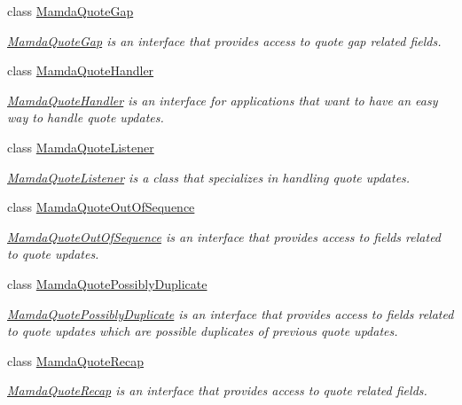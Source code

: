 \begin{CompactItemize}
class \hyperlink{classWombat_1_1MamdaQuoteGap}{Mamda\-Quote\-Gap}
\begin{CompactList}\small\item\em \hyperlink{classWombat_1_1MamdaQuoteGap}{Mamda\-Quote\-Gap} is an interface that provides access to quote gap related fields. \item\end{CompactList}\item 
class \hyperlink{classWombat_1_1MamdaQuoteHandler}{Mamda\-Quote\-Handler}
\begin{CompactList}\small\item\em \hyperlink{classWombat_1_1MamdaQuoteHandler}{Mamda\-Quote\-Handler} is an interface for applications that want to have an easy way to handle quote updates. \item\end{CompactList}\item 
class \hyperlink{classWombat_1_1MamdaQuoteListener}{Mamda\-Quote\-Listener}
\begin{CompactList}\small\item\em \hyperlink{classWombat_1_1MamdaQuoteListener}{Mamda\-Quote\-Listener} is a class that specializes in handling quote updates. \item\end{CompactList}\item 
class \hyperlink{classWombat_1_1MamdaQuoteOutOfSequence}{Mamda\-Quote\-Out\-Of\-Sequence}
\begin{CompactList}\small\item\em \hyperlink{classWombat_1_1MamdaQuoteOutOfSequence}{Mamda\-Quote\-Out\-Of\-Sequence} is an interface that provides access to fields related to quote updates. \item\end{CompactList}\item 
class \hyperlink{classWombat_1_1MamdaQuotePossiblyDuplicate}{Mamda\-Quote\-Possibly\-Duplicate}
\begin{CompactList}\small\item\em \hyperlink{classWombat_1_1MamdaQuotePossiblyDuplicate}{Mamda\-Quote\-Possibly\-Duplicate} is an interface that provides access to fields related to quote updates which are possible duplicates of previous quote updates. \item\end{CompactList}\item 
class \hyperlink{classWombat_1_1MamdaQuoteRecap}{Mamda\-Quote\-Recap}
\begin{CompactList}\small\item\em \hyperlink{classWombat_1_1MamdaQuoteRecap}{Mamda\-Quote\-Recap} is an interface that provides access to quote related fields. \item\end{CompactList}\item 

\end{CompactItemize}
